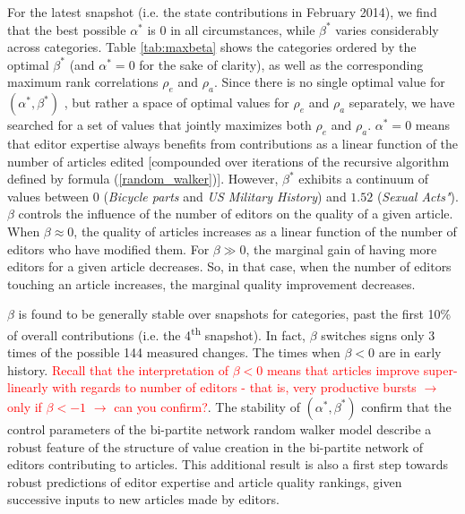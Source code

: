 
For the latest snapshot (i.e. the state contributions in February 2014), we find that the best possible $\alpha^*$ is $0$ in all circumstances, while $\beta^*$ varies considerably across categories. Table \ref{tab:maxbeta} shows the categories ordered by the optimal $\beta^*$ (and $\alpha^*=0$ for the sake of clarity), as well as the corresponding maximum rank correlations $\rho_e$ and $\rho_a$. Since there is no single optimal value for $(\alpha^*,\beta^*)$ , but rather a space of optimal values for  $\rho_e$ and $\rho_a$ separately, we have searched for a set of values that jointly maximizes both $\rho_e$ and $\rho_a$. $\alpha^* = 0$ means that editor expertise always benefits from contributions as a linear function of the number of articles edited [compounded over iterations of the recursive algorithm defined by formula (\ref{random_walker})].  However, $\beta^*$ exhibits a continuum of values between $0$ ({\it Bicycle parts} and {\it US Military History}) and $1.52$ ({\it Sexual Acts"}). $\beta$ controls the influence of the number of editors on the quality of a given article. When $\beta \approx 0$, the quality of articles increases as a linear function of the number of editors who have modified them. For $\beta \gg 0$, the marginal gain of having more editors for a given article decreases. So, in that case, when the number of editors touching an article increases, the marginal quality improvement decreases.

$\beta$ is found to be generally stable over snapshots for categories, past the first 10\% of overall contributions (i.e. the 4\textsuperscript{th} snapshot). In fact, $\beta$ switches signs only 3 times of the possible 144 measured changes. The times when $\beta < 0$ are in early history. \textcolor{red}{Recall that the interpretation of $\beta < 0$ means that articles improve super-linearly with regards to number of editors - that is, very productive bursts $\rightarrow$ only if $\beta < -1$ $\rightarrow$ can you confirm?}. The stability of $(\alpha^*,\beta^*)$ confirm that the control parameters of the bi-partite network random walker model describe a robust feature of the structure of value creation in the bi-partite network of editors contributing to articles. This additional result is also a first step towards robust predictions of editor expertise and article quality rankings, given successive inputs to new articles made by editors.


